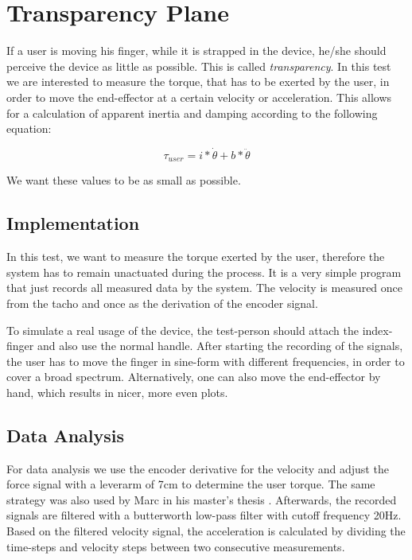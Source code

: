 \section{Transparency Plane}
If a user is moving his finger, while it is strapped in the device, he/she should perceive the device as little as possible. This is called \emph{transparency}. In this test we are interested to measure the torque, that has to be exerted by the user, in order to move the end-effector at a certain velocity or acceleration. This allows for a calculation of apparent inertia and damping according to the following equation:

\begin{equation}
    \tau_{user} = i*\dot \theta + b*\ddot \theta
\end{equation}

We want these values to be as small as possible.

\subsection{Implementation}

In this test, we want to measure the torque exerted by the user, therefore the system has to remain unactuated during the process. It is a very simple program that just records all measured data by the system. The velocity is measured once from the tacho and once as the derivation of the encoder signal.

To simulate a real usage of the device, the test-person should attach the index-finger and also use the normal handle. After starting the recording of the signals, the user has to move the finger in sine-form with different frequencies, in order to cover a broad spectrum. Alternatively, one can also move the end-effector by hand, which results in nicer, more even plots. 

\subsection{Data Analysis}

For data analysis we use the encoder derivative for the velocity and adjust the force signal with a leverarm of 7cm to determine the user torque. The same strategy was also used by Marc in his master's thesis \cite{marc}. Afterwards, the recorded signals are filtered with a butterworth low-pass filter with cutoff frequency 20Hz. Based on the filtered velocity signal, the acceleration is calculated by dividing the time-steps and velocity steps between two consecutive measurements.

